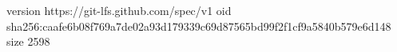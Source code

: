 version https://git-lfs.github.com/spec/v1
oid sha256:caafe6b08f769a7de02a93d179339c69d87565bd99f2f1cf9a5840b579e6d148
size 2598
